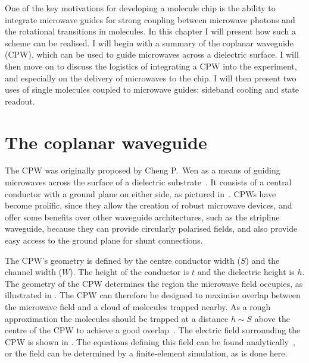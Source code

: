 One of the key motivations for developing a molecule chip is the ability to
integrate microwave guides for strong coupling between microwave photons and
the rotational transitions in molecules. In this chapter I will present how
such a scheme can be realised.  I will begin with a summary of the coplanar
waveguide (CPW), which can be used to guide microwaves across a dielectric
surface. I will then move on to discuss the logistics of integrating a CPW into
the experiment, and especially on the delivery of microwaves to the chip. I
will then present two uses of single \CaF{} molecules coupled to microwave
guides: sideband cooling and state readout.

\section{The coplanar waveguide}
\label{mws:CPW}

The CPW was originally proposed by Cheng P.~Wen as a means
of guiding microwaves across the surface of a dielectric
substrate~\cite{1127105}. It consists of a central conductor with a ground
plane on either side, as pictured in~. CPWs have become
prolific, since they allow the creation of robust microwave devices, and offer
some benefits over other waveguide architectures, such as the stripline
waveguide, because they can provide circularly polarised fields, and also
provide easy access to the ground plane for shunt connections.

The CPW's geometry is defined by the centre conductor width ($S$) and the
channel width ($W$). The height of the conductor is $t$ and the dielectric
height is $h$.  The geometry of the CPW determines the region the microwave
field occupies, as illustrated in .  The CPW
can therefore be designed to maximise overlap between the microwave field and a
cloud of molecules trapped nearby.  As a rough approximation the molecules
should be trapped at a distance $h\sim S$ above the centre of the CPW to
achieve a good overlap~\cite{Boehi2009}. The electric field surrounding the CPW is shown
in . The equations defining this field can be found
analytically~\cite{Simons2004}, or the field can be determined by a
finite-element simulation, as is done here.

